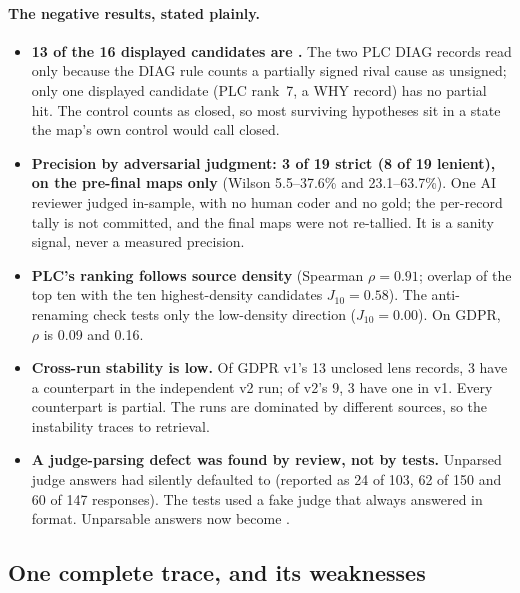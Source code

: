 \paragraph{The negative results, stated plainly.}
\begin{itemize}[nosep]
  \item \evobs{} \textbf{13 of the 16 displayed candidates are .} The two PLC DIAG records
    read  only because the DIAG rule counts a partially signed rival cause as unsigned; only
    one displayed candidate (PLC rank~7, a WHY record) has no partial hit. \evint{} The control
    counts  as closed, so most surviving hypotheses sit in a state the map's own control
    would call closed.
  \item \evobs{} \textbf{Precision by adversarial judgment: 3 of 19 strict (8 of 19 lenient), on the
    pre-final maps only} (Wilson 5.5--37.6\% and 23.1--63.7\%). One AI reviewer judged in-sample, with no
    human coder and no gold; the per-record tally is not committed, and the final maps were not
    re-tallied. It is a sanity signal, never a measured precision.
  \item \evobs{} \textbf{PLC's ranking follows source density} (Spearman $\rho = 0.91$; overlap of the
    top ten with the ten highest-density candidates $J_{10} = 0.58$). The anti-renaming check tests only
    the low-density direction ($J_{10} = 0.00$). On GDPR, $\rho$ is 0.09 and 0.16.
  \item \evobs{} \textbf{Cross-run stability is low.} Of GDPR v1's 13 unclosed lens records, 3 have a
    counterpart in the independent v2 run; of v2's 9, 3 have one in v1. Every counterpart is partial.
    \evint{} The runs are dominated by different sources, so the instability traces to retrieval.
  \item \evobs{} \textbf{A judge-parsing defect was found by review, not by tests.} Unparsed judge
    answers had silently defaulted to  (reported as 24 of 103, 62 of 150 and 60 of 147
    responses). The tests used a fake judge that always answered in format. Unparsable answers now
    become .
\end{itemize}

\subsection{One complete trace, and its weaknesses}\label{sec:trace}

